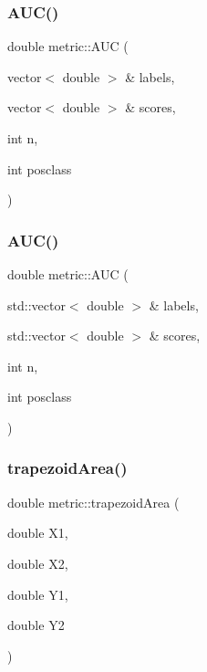 \subsubsection{\texorpdfstring{A\+U\+C()}{AUC()}\hspace{0.1cm}{\footnotesize\ttfamily [1/2]}}
{\footnotesize\ttfamily double metric\+::\+A\+UC (\begin{DoxyParamCaption}\item[{vector$<$ double $>$ \&}]{labels,  }\item[{vector$<$ double $>$ \&}]{scores,  }\item[{int}]{n,  }\item[{int}]{posclass }\end{DoxyParamCaption})}

\mbox{\label{namespacemetric_af2bf0a8c7be4bee4eff0abaa603e842e}} 
\subsubsection{\texorpdfstring{A\+U\+C()}{AUC()}\hspace{0.1cm}{\footnotesize\ttfamily [2/2]}}
{\footnotesize\ttfamily double metric\+::\+A\+UC (\begin{DoxyParamCaption}\item[{std\+::vector$<$ double $>$ \&}]{labels,  }\item[{std\+::vector$<$ double $>$ \&}]{scores,  }\item[{int}]{n,  }\item[{int}]{posclass }\end{DoxyParamCaption})}

\mbox{\label{namespacemetric_a87e5308fcebc95b5720c24dc70d74349}} 
\subsubsection{\texorpdfstring{trapezoid\+Area()}{trapezoidArea()}}
{\footnotesize\ttfamily double metric\+::trapezoid\+Area (\begin{DoxyParamCaption}\item[{double}]{X1,  }\item[{double}]{X2,  }\item[{double}]{Y1,  }\item[{double}]{Y2 }\end{DoxyParamCaption})}

